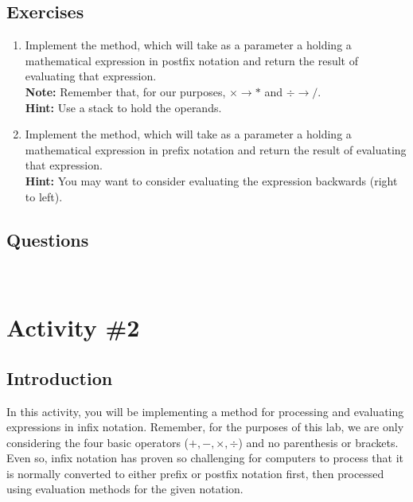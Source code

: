 		\subsection{Exercises}
			\begin{enumerate}
				\item Implement the  method, which will take as a parameter a  holding a mathematical expression in postfix notation and return the result of evaluating that expression.\\
				{\small\textbf{Note:} Remember that, for our purposes, $\times \to *$ and $\div \to /$.}\\
				{\small\textbf{Hint:} Use a stack to hold the operands.}
				\item Implement the  method, which will take as a parameter a  holding a mathematical expression in prefix notation and return the result of evaluating that expression.\\
				{\small\textbf{Hint:} You may want to consider evaluating the expression backwards (right to left).}
			\end{enumerate}

		\subsection{Questions}
			\ \\[9pt]

	\pagebreak

	\section{Activity \#2}
		\subsection{Introduction}
			In this activity, you will be implementing a method for processing and evaluating expressions in infix notation. Remember, for the purposes of this lab, we are only considering the four basic operators ($+, -, \times, \div$) and no parenthesis or brackets. Even so, infix notation has proven so challenging for computers to process that it is normally converted to either prefix or postfix notation first, then processed using evaluation methods for the given notation.

